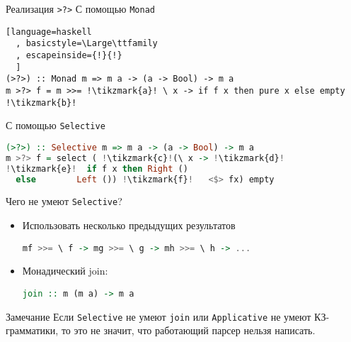 \begin{frame}[fragile]{Реализация \texttt{>?>}}
\Large
С помощью \texttt{Monad}
\begin{lstlisting}[language=haskell
  , basicstyle=\Large\ttfamily
  , escapeinside={!}{!}
  ]
(>?>) :: Monad m => m a -> (a -> Bool) -> m a
m >?> f = m >>= !\tikzmark{a}! \ x -> if f x then pure x else empty !\tikzmark{b}!
\end{lstlisting}
\pause 

С помощью \texttt{Selective}
\begin{lstlisting}[language=haskell
  , basicstyle=\Large\ttfamily
  , escapechar=!
  , mathescape=false
  ]
(>?>) :: Selective m => m a -> (a -> Bool) -> m a
m >?> f = select ( !\tikzmark{c}!(\ x -> !\tikzmark{d}!
!\tikzmark{e}!  if f x then Right () 
  else        Left ()) !\tikzmark{f}!   <$> fx) empty 
\end{lstlisting}
\end{frame}

\begin{frame}[fragile]{Чего не умеют \texttt{Selective}?}
\Large 
\begin{itemize}
\item Использовать несколько предыдущих результатов

  \lstinline[language=haskell, basicstyle=\Large\ttfamily]{mf >>= \ f -> mg >>= \ g -> mh >>= \ h -> ... }
\item Монадический join:

 \lstinline[language=haskell, basicstyle=\Large\ttfamily]{join :: m (m a) -> m a}
\end{itemize}
\newln 

\begin{block}{Замечание}
Если \texttt{Selective} не умеют \texttt{join}
или \texttt{Applicative} не умеют КЗ-грамматики, то это не значит, что работающий парсер нельзя написать.
\end{block}
\end{frame}


